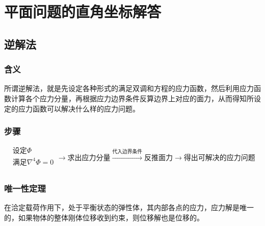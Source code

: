 \section{平面问题的直角坐标解答}
\subsection{逆解法}
\subsubsection{含义}
所谓逆解法，就是先设定各种形式的满足双调和方程的应力函数，然后利用应力函数计算各个应力分量，再根据应力边界条件反算边界上对应的面力，从而得知所设定的应力函数可以解决什么样的应力问题。
\subsubsection{步骤}
\[\begin{array}{c}
\text{设定}\Phi\\
\text{满足}\nabla ^4\Phi =0\\
\end{array}\rightarrow \text{求出应力分量}\xrightarrow{\text{代入边界条件}}\text{反推面力}\rightarrow \text{得出可解决的应力问题}\]
\subsubsection{唯一性定理}
在洽定载荷作用下，处于平衡状态的弹性体，其内部各点的应力，应力解是唯一的，如果物体的整体刚体位移收到约束，则位移解也是位移的。
